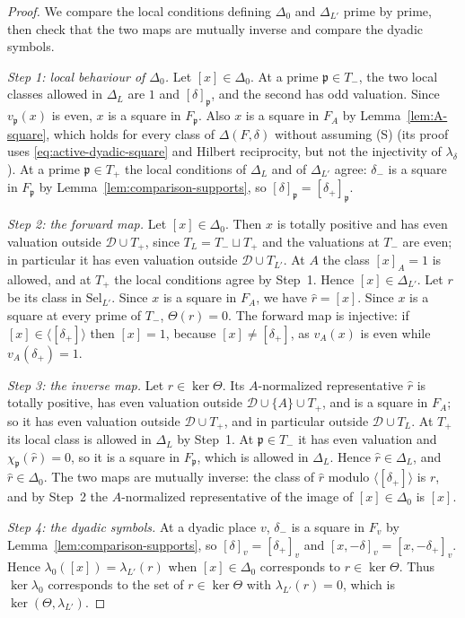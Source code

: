 \documentclass[11pt]{article}
\theoremstyle{plain}
\theoremstyle{definition}
\theoremstyle{remark}
\begin{document}
\begin{proof}
We compare the local conditions defining $\Delta_0$ and $\Delta_{L'}$
prime by prime, then check that the two maps are mutually inverse and
compare the dyadic symbols.

\emph{Step 1: local behaviour of $\Delta_0$.}  Let $[x]\in\Delta_0$.  At a
prime $\mathfrak p\in T_-$, the two local classes allowed in $\Delta_L$
are $1$ and $[\delta]_{\mathfrak p}$, and the second has odd valuation.
Since $v_{\mathfrak p}(x)$ is even, $x$ is a square in $F_{\mathfrak p}$.
Also $x$ is a square in $F_A$ by Lemma~\ref{lem:A-square}, which holds
for every class of $\Delta(F,\delta)$ without assuming (S) (its proof
uses \eqref{eq:active-dyadic-square} and Hilbert reciprocity, but not the
injectivity of $\lambda_\delta$).  At a
prime $\mathfrak p\in T_+$ the local conditions of $\Delta_L$ and of
$\Delta_{L'}$ agree: $\delta_-$ is a square in $F_{\mathfrak p}$ by
Lemma~\ref{lem:comparison-supports}, so
$[\delta]_{\mathfrak p}=[\delta_+]_{\mathfrak p}$.

\emph{Step 2: the forward map.}  Let $[x]\in\Delta_0$.  Then $x$ is
totally positive and has even valuation outside $\mathcal D\cup T_+$, since
$T_L=T_-\sqcup T_+$ and the valuations at $T_-$ are even; in particular it
has even valuation outside $\mathcal D\cup T_{L'}$.  At $A$ the class
$[x]_A=1$ is allowed, and at $T_+$ the local conditions agree by Step~1.
Hence $[x]\in\Delta_{L'}$.  Let $r$ be its class in $\mathrm{Sel}_{L'}$.
Since $x$ is a square in $F_A$, we have $\hat r=[x]$.  Since $x$ is a
square at every prime of $T_-$, $\Theta(r)=0$.  The forward map is
injective: if $[x]\in\langle[\delta_+]\rangle$ then $[x]=1$, because
$[x]\ne[\delta_+]$, as $v_A(x)$ is even while $v_A(\delta_+)=1$.

\emph{Step 3: the inverse map.}  Let $r\in\ker\Theta$.  Its
$A$-normalized representative $\hat r$ is totally positive, has even
valuation outside $\mathcal D\cup\{A\}\cup T_+$, and is a square in $F_A$;
so it has even valuation outside $\mathcal D\cup T_+$, and in particular
outside $\mathcal D\cup T_L$.  At $T_+$ its local class is allowed in
$\Delta_L$ by Step~1.  At $\mathfrak p\in T_-$ it has even valuation and
$\chi_{\mathfrak p}(\hat r)=0$, so it is a square in $F_{\mathfrak p}$,
which is allowed in $\Delta_L$.  Hence $\hat r\in\Delta_L$, and
$\hat r\in\Delta_0$.  The two maps are mutually inverse: the class of
$\hat r$ modulo $\langle[\delta_+]\rangle$ is $r$, and by Step~2 the
$A$-normalized representative of the image of $[x]\in\Delta_0$ is $[x]$.

\emph{Step 4: the dyadic symbols.}  At a dyadic place $v$, $\delta_-$ is a
square in $F_v$ by Lemma~\ref{lem:comparison-supports}, so
$[\delta]_v=[\delta_+]_v$ and $[x,-\delta]_v=[x,-\delta_+]_v$.  Hence
$\lambda_0([x])=\lambda_{L'}(r)$ when $[x]\in\Delta_0$ corresponds to
$r\in\ker\Theta$.  Thus $\ker\lambda_0$ corresponds to the set of
$r\in\ker\Theta$ with $\lambda_{L'}(r)=0$, which is
$\ker(\Theta,\lambda_{L'})$.
\end{proof}
\end{document}
